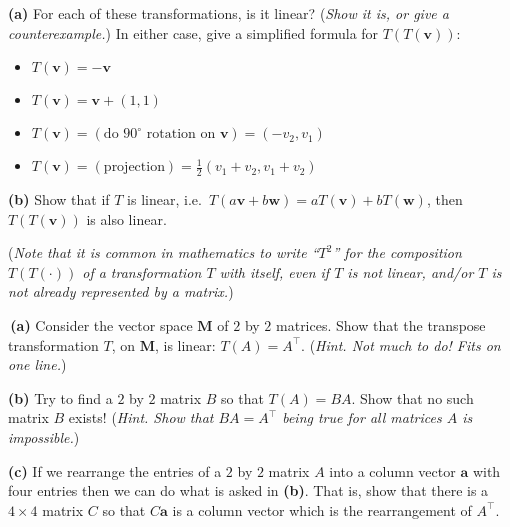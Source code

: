 \documentclass[12pt]{amsart}
\newcommand{\ba}{\bm{a}}
\newcommand{\bv}{\bm{v}}
\newcommand{\bw}{\bm{w}}
\newcommand{\bM}{\bm{M}}
\newcommand{\prob}[1]{\bigskip\noindent{\large \textbf{#1.}}\quad }
\newcommand{\epart}[1]{\medskip\noindent\textbf{(#1)}\quad }
\newcommand{\ppart}[1]{\,\textbf{(#1)}\quad }
\begin{document}
\epart{a} For each of these transformations, is it linear?  (\emph{Show it is, or give a counterexample.})  In either case, give a simplified formula for $T(T(\bv))$:
\begin{itemize}
\item $T(\bv) = -\bv$
\item $T(\bv) = \bv + (1,1)$
\item $T(\bv) = \left(\text{do $90^\circ$ rotation on $\bv$}\right) = (-v_2,v_1)$
\item $T(\bv) = (\text{projection}) = \frac{1}{2} (v_1+v_2,v_1+v_2)$
\end{itemize}

\epart{b} Show that if $T$ is linear, i.e.~$T(a\bv+b\bw)=a T(\bv) + b T(\bw)$, then $T(T(\bv))$ is also linear.

\medskip
\noindent (\emph{Note that it is common in mathematics to write ``$T^2$'' for the composition $T(T(\cdot))$ of a transformation $T$ with itself, even if $T$ is not linear, and/or $T$ is not already represented by a matrix.})


\prob{P61}  \ppart{a} Consider the vector space $\bM$ of $2$ by $2$ matrices.  Show that the transpose transformation $T$, on $\bM$, is linear: $T(A) = A^\top$.  (\emph{Hint.  Not much to do!  Fits on one line.})

\epart{b}  Try to find a $2$ by $2$ matrix $B$ so that $T(A) = B A$.  Show that no such matrix $B$ exists!  (\emph{Hint.  Show that $BA=A^\top$ being true for \emph{all} matrices $A$ is impossible.})

\epart{c}  If we rearrange the entries of a $2$ by $2$ matrix $A$ into a column vector $\ba$ with four entries then we can do what is asked in \textbf{(b)}.  That is, show that there is a $4\times 4$ matrix $C$ so that $C \ba$ is a column vector which is the rearrangement of $A^\top$.
\end{document}
